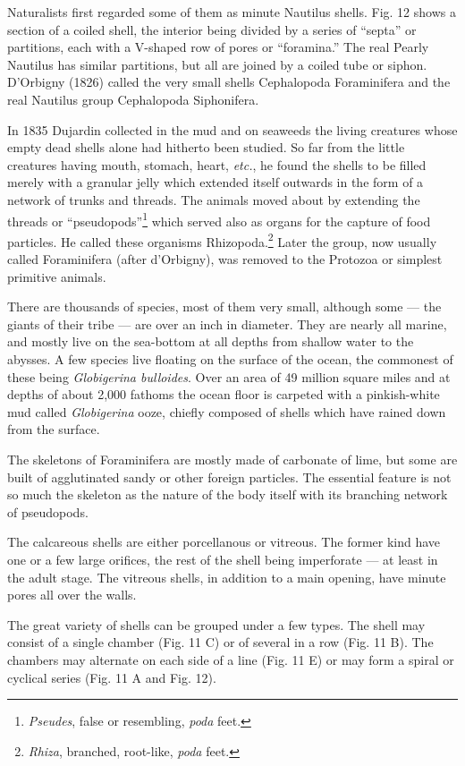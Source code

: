 \documentclass[a4paper, 12pt, oneside]{article}
\begin{document}
Naturalists first regarded some of them as minute Nautilus shells. Fig. 12 shows a section of a coiled shell, the interior being divided by a series of ``septa'' or partitions, each with a V-shaped row of pores or ``foramina.'' The real Pearly Nautilus has similar partitions, but all are joined by a coiled tube or siphon. D'Orbigny (1826) called the very small shells Cephalopoda Foraminifera and the real Nautilus group Cephalopoda Siphonifera.

In 1835 Dujardin collected in the mud and on seaweeds the living creatures whose empty dead shells alone had hitherto been studied. So far from the little creatures having mouth, stomach, heart, \emph{etc.}, he found the shells to be filled merely with a granular jelly which extended itself outwards in the form of a network of trunks and threads. The animals moved about by extending the threads or ``pseudopods''\footnote{\emph{Pseudes}, false or resembling, \emph{poda} feet.} which served also as organs for the capture of food particles. He called these organisms Rhizopoda.\footnote{\emph{Rhiza}, branched, root-like, \emph{poda} feet.} Later the group, now usually called Foraminifera (after d'Orbigny), was removed to the Protozoa or simplest primitive animals.

There are thousands of species, most of them very small, although some --- the giants of their tribe --- are over an inch in diameter. They are nearly all marine, and mostly live on the sea-bottom at all depths from shallow water to the abysses. A few species live floating on the surface of the ocean, the commonest of these being \emph{Globigerina bulloides}. Over an area of 49 million square miles and at depths of about 2,000 fathoms the ocean floor is carpeted with a pinkish-white mud called \emph{Globigerina} ooze, chiefly composed of shells which have rained down from the surface.

The skeletons of Foraminifera are mostly made of carbonate of lime, but some are built of agglutinated sandy or other foreign particles. The essential feature is not so much the skeleton as the nature of the body itself with its branching network of pseudopods.

The calcareous shells are either porcellanous or vitreous. The former kind have one or a few large orifices, the rest of the shell being imperforate --- at least in the adult stage. The vitreous shells, in addition to a main opening, have minute pores all over the walls.

The great variety of shells can be grouped under a few types. The shell may consist of a single chamber (Fig. 11 C) or of several in a row (Fig. 11 B). The chambers may alternate on each side of a line (Fig. 11 E) or may form a spiral or cyclical series (Fig. 11 A and Fig. 12).
\end{document}
